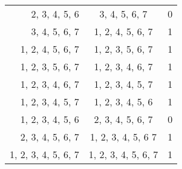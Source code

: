 \begin{solution}
\begin{enumerate}[(a)]
\begin{multicols}{2}
\begin{tabular}[t]{r c r}
            2, 3, 4, 5, 6 & 3, 4, 5, 6, 7 & 0\\
            3, 4, 5, 6, 7 & 1, 2, 4, 5, 6, 7 & 1\\
            1, 2, 4, 5, 6, 7 & 1, 2, 3, 5, 6, 7 & 1\\
            1, 2, 3, 5, 6, 7 & 1, 2, 3, 4, 6, 7 & 1\\
            1, 2, 3, 4, 6, 7 & 1, 2, 3, 4, 5, 7 & 1\\
            1, 2, 3, 4, 5, 7 & 1, 2, 3, 4, 5, 6 & 1\\
            1, 2, 3, 4, 5, 6 & 2, 3, 4, 5, 6, 7 & 0\\
            2, 3, 4, 5, 6, 7 & 1, 2, 3, 4, 5, 6 7 & 1\\
            1, 2, 3, 4, 5, 6, 7 & 1, 2, 3, 4, 5, 6, 7 & 1
        \end{tabular}
        

\end{multicols}
\end{enumerate}
\end{solution}
